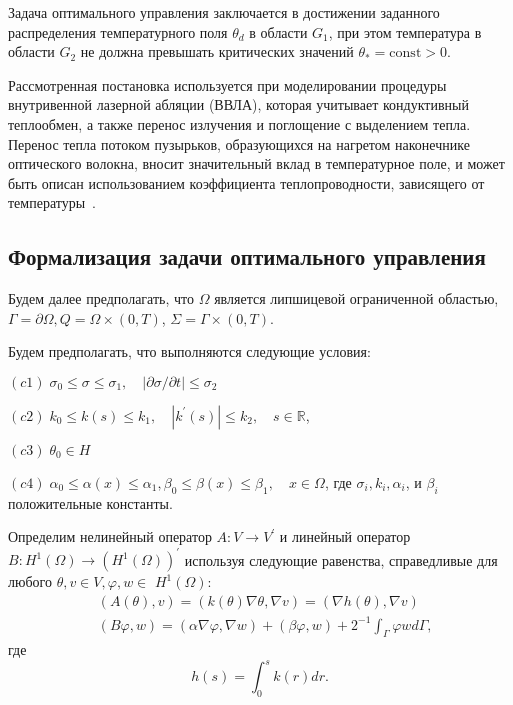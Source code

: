 \begin{remark}
    Задача оптимального управления заключается в достижении заданного распределения
    температурного поля $\theta_{d}$ в области $G_{1}$, при этом температура в области
    $G_{2}$ не должна превышать критических значений $\theta_{*}=\text{const}>0$.
\end{remark}

Рассмотренная постановка используется при
моделировании процедуры внутривенной лазерной абляции (ВВЛА),
которая учитывает кондуктивный теплообмен,
а также перенос излучения и поглощение с выделением тепла.
Перенос тепла потоком пузырьков, образующихся на нагретом наконечнике оптического волокна,
вносит значительный вклад в температурное поле,
и может быть описан использованием коэффициента теплопроводности, зависящего от
температуры~\cite{van2014optical, Some_Poluektova2014, Endovenous_Malskat2014}.

\subsection{Формализация задачи оптимального управления}
\label{subsec:ch3:sec2:subsec2}

Будем далее предполагать, что $\Omega$ является липшицевой ограниченной областью,
$\Gamma=\partial \Omega, Q=\Omega \times(0, T)$, $\Sigma=\Gamma \times(0, T)$.

Будем предполагать, что выполняются следующие условия:

$(c1)\; \sigma_{0} \leq \sigma \leq \sigma_{1},
\quad|\partial \sigma / \partial t| \leq \sigma_{2}$

$(c2)\; k_{0} \leq k(s) \leq k_{1}, \quad\left|k^{\prime}(s)\right| \leq k_{2},
\quad s \in \mathbb{R}$,

$(c3)\; \theta_{0} \in H$

$(c4)\; \alpha_{0} \leq \alpha(x) \leq \alpha_{1},
\beta_{0} \leq \beta(x) \leq \beta_{1}, \quad x \in \Omega$,
где $\sigma_{i}, k_{i}, \alpha_{i}$, и $\beta_{i}$ положительные константы.

Определим нелинейный оператор $A: V \rightarrow V^{\prime}$ и линейный оператор
$B: H^{1}(\Omega) \rightarrow\left(H^{1}(\Omega)\right)^{\prime}$
используя следующие равенства, справедливые для любого
$\theta, v \in V, \varphi, w \in$ $H^{1}(\Omega)$:
\[
    \begin{aligned}
        &(A(\theta), v)=(k(\theta) \nabla \theta, \nabla v)=(\nabla h(\theta), \nabla v) \\
        &(B \varphi, w)=(\alpha \nabla \varphi, \nabla w)+(\beta \varphi, w)+2^{-1}
        \int_{\Gamma} \varphi w d \Gamma,
    \end{aligned}
\]
где
\[
    h(s)=\int_{0}^{s} k(r) d r.
\]

